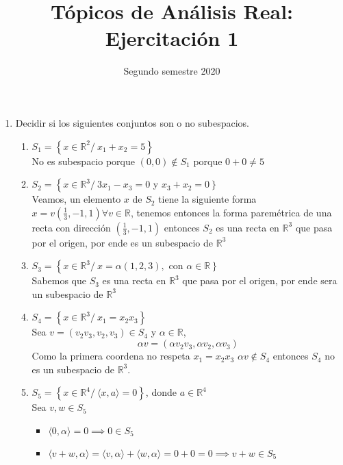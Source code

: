 \documentclass[11pt]{article}
\title{ Tópicos de Análisis Real: Ejercitación 1 }
\date{ Segundo semestre 2020 }
\begin{document}
\maketitle
\begin{enumerate}
  \item Decidir si los siguientes conjuntos son o no subespacios.
    \begin{enumerate}
      \item $S_{1}=\left\{x \in \mathbb{R}^{2} / \ x_{1}+x_{2}=5\right\}$\\
        No es subespacio porque $(0,0) \notin S_1$ porque $0+0\neq 5$
      \item $S_{2}=\left\{x \in \mathbb{R}^{3} / \ 3 x_{1}-x_{3}=0\right.$ y 
        $\left.x_{3}+x_{2}=0\right\}$\\
        Veamos, un elemento $x$ de $S_2$ tiene la siguiente forma 
        $x = v \left( \frac{1}{3} ,-1,1 \right) \forall v \in \mathbb{R}$, 
        tenemos entonces la forma paremétrica de una recta con dirección 
        $(\frac{1}{3},-1,1)$ entonces $S_2$ es una recta en $\mathbb{R}^3$ 
        que pasa por el origen, por ende es un subespacio de $\mathbb{R}^3$
      \item $S_{3}=\left\{x \in \mathbb{R}^{3} / \ x=\alpha(1,2,3),\right.$ con 
        $\left.\alpha \in \mathbb{R}\right\}$\\
        Sabemos que $S_3$ es una recta en $\mathbb{R}^3$ que pasa por el origen,
        por ende sera un subespacio de $\mathbb{R}^3$
      \item $S_{4}=\left\{x \in \mathbb{R}^{3} / \ x_{1}=x_{2} x_{3}\right\}$\\
        Sea $v = (v_2 v_3, v_2, v_3) \in S_4$ y $\alpha \in \mathbb{R}$,
        \[ \alpha v =  (\alpha v_2 v_3,\alpha v_2, \alpha v_3) \]
        Como la primera coordena no respeta $x_1 = x_2 x_3 $ $\alpha v \notin S_4$
        entonces $S_4$ no es un subespacio de $\mathbb{R}^3$.
      \item $S_{5}=\left\{x \in \mathbb{R}^{4} / \ \langle x, a\rangle =0 \right\}$,
        donde $a \in \mathbb{R}^{4}$\\
        Sea $v, w \in S_5$ \\
        \begin{itemize}
          \item $ \langle 0, \alpha \rangle = 0 \implies 0 \in S_5$
          \item $ \langle v + w, \alpha \rangle = \langle v, \alpha \rangle 
            + \langle w, \alpha \rangle = 0 + 0 = 0 \implies v + w \in S_5 $

\end{itemize}
\end{enumerate}
\end{enumerate}
\end{document}
